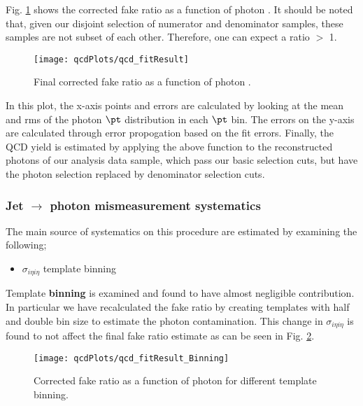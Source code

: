 Fig. \ref{fig:fitResult} shows the corrected fake ratio as a function of photon \et. It should be noted that, given our disjoint selection of numerator and denominator samples, these samples are not subset of each other. Therefore, one can expect a ratio $>$ 1.

\begin{figure}[hbtp]
\begin{center}
\texttt{[image: qcdPlots/qcd\_fitResult]}
\caption{Final corrected fake ratio as a function of photon \et.}
\label{fig:fitResult}
\end{center}
\end{figure}

In this plot, the x-axis points and errors are calculated by looking at the mean and rms of the photon $\pt$ distribution in each $\pt$ bin. 
The errors on the y-axis are calculated through error propogation based on the fit errors. 
Finally, the QCD yield is estimated by applying the above function to the reconstructed photons of our analysis data sample,
which pass our basic selection cuts, but have the photon selection replaced by denominator selection cuts.

\subsubsection{Jet $\rightarrow$ photon mismeasurement systematics} 
The main source of systematics on this procedure are estimated by examining the following;

\begin{itemize}
\item $\sigma_{i\eta i\eta}$ template binning
\end{itemize}

Template \textbf{binning} is examined and found to have almost negligible contribution. In particular we have recalculated the fake ratio by creating templates with half and
double bin size to estimate the photon contamination. This change in $\sigma_{i\eta i\eta}$ is found to not affect the final fake ratio estimate as can be seen in Fig. \ref{fig:fit_BINNINGsys}.

\begin{figure}[hbtp]
\begin{center}
\texttt{[image: qcdPlots/qcd\_fitResult\_Binning]}
\caption{Corrected fake ratio as a function of photon \et for different template binning.}
\label{fig:fit_BINNINGsys}
\end{center}
\end{figure}

